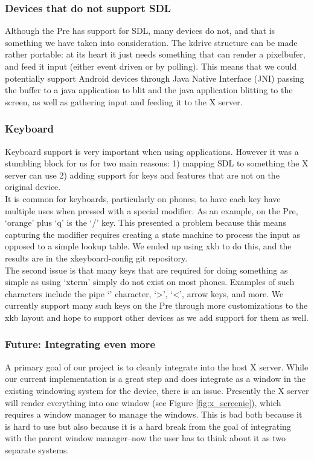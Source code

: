 \subsubsection{Devices that do not support SDL}
Although the Pre has support for SDL, many devices do not, and that is something we have taken into consideration.  The kdrive structure can be made rather portable: at its heart it just needs something that can render a pixelbufer, and feed it input (either event driven or by polling).  This means that we could potentially support Android devices through Java Native Interface (JNI) \cite{jni} passing the buffer to a java application to blit and the java application blitting to the screen, as well as gathering input and feeding it to the X server. \\

\subsubsection{Keyboard}
Keyboard support is very important when using applications.  However it was a stumbling block for us for two main reasons: 1) mapping SDL to something the X server can use 2) adding support for keys and features that are not on the original device.\\

It is common for keyboards, particularly on phones, to have each key have multiple uses when pressed with a special modifier.  As an example, on the Pre, `orange' plus `q' is the `/' key.  This presented a problem because this means capturing the modifier requires creating a state machine to process the input as opposed to a simple lookup table.  We ended up using xkb to do this, and the results are in the xkeyboard-config git repository. \\

The second issue is that many keys that are required for doing something as simple as using `xterm' simply do not exist on most phones.  Examples of such characters include the pipe `\textbar' character, `\textgreater', `\textless', arrow keys, and more.  We currently support many such keys on the Pre through more customizations to the xkb layout and hope to support other devices as we add support for them as well. \\

\subsubsection{Future: Integrating even more}
A primary goal of our project is to cleanly integrate into the host X server.  While our current implementation is a great step and does integrate as a window in the existing windowing system for the device, there is an issue.  Presently the X server will render everything into one window (see Figure \ref{fig:x_screenie}), which requires a window manager to manage the windows.  This is bad both because it is hard to use but also because it is a hard break from the goal of integrating with the parent window manager--now the user has to think about it as two separate systems.\\


